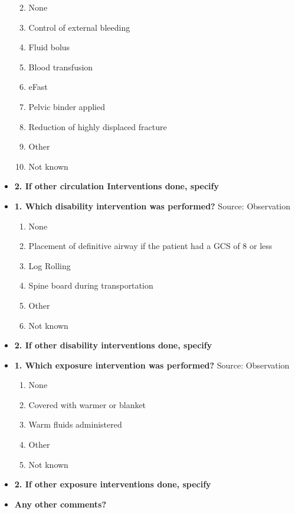 \documentclass[
]{scrartcl}
\providecommand{\tightlist}{%
  \setlength{\itemsep}{0pt}\setlength{\parskip}{0pt}}\usepackage{longtable,booktabs,array}
\begin{document}
\begin{itemize}
  \begin{enumerate}
  \def\labelenumi{\arabic{enumi}.}
  \tightlist
  \item
    None
  \item
    Control of external bleeding
  \item
    Fluid bolus
  \item
    Blood transfusion
  \item
    eFast
  \item
    Pelvic binder applied
  \item
    Reduction of highly displaced fracture
  \item
    Other
  \item
    Not known
  \end{enumerate}
\item
  \textbf{2. If other circulation Interventions done, specify}
\item
  \textbf{1. Which disability intervention was performed?} Source:
  Observation

  \begin{enumerate}
  \def\labelenumi{\arabic{enumi}.}
  \tightlist
  \item
    None
  \item
    Placement of definitive airway if the patient had a GCS of 8 or less
  \item
    Log Rolling
  \item
    Spine board during transportation
  \item
    Other
  \item
    Not known
  \end{enumerate}
\item
  \textbf{2. If other disability interventions done, specify}
\item
  \textbf{1. Which exposure intervention was performed?} Source:
  Observation

  \begin{enumerate}
  \def\labelenumi{\arabic{enumi}.}
  \tightlist
  \item
    None
  \item
    Covered with warmer or blanket
  \item
    Warm fluids administered
  \item
    Other
  \item
    Not known
  \end{enumerate}
\item
  \textbf{2. If other exposure interventions done, specify}
\item
  \textbf{Any other comments?}
\end{itemize}
\end{document}
